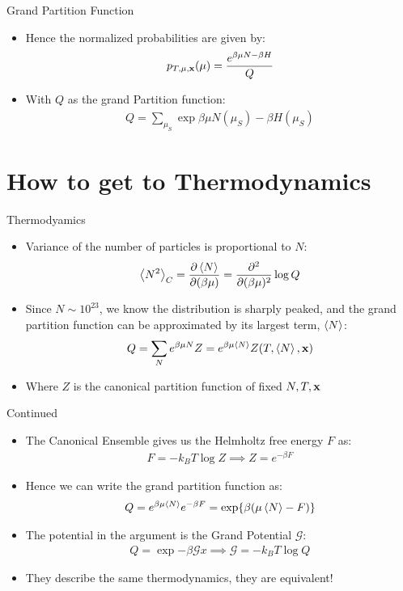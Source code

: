 \documentclass{beamer}
\begin{document}
\begin{frame}{Grand Partition Function}
  \begin{itemize}
  \item Hence the normalized probabilities are given by:
    \begin{align*}
      p_{T,\mu,\vb{x}}(\mu)=\frac{e^{\beta\mu N-\beta H}}{Q}
    \end{align*}
  \item With $Q$ as the grand Partition function:
    \begin{align*}
      Q=\sum_{\mu_S}\exp{\beta\mu N(\mu_S)-\beta H(\mu_S)}
    \end{align*}
  \end{itemize}
\end{frame}

\section{How to get to Thermodynamics}
\begin{frame}{Thermodyamics}
  \begin{itemize}
  \item Variance of the number of particles is proportional to $N$:
    \begin{align*}
      \ev{N^2}_C=\pdv{\ev{N}}{(\beta\mu)}=\pdv[2]{(\beta\mu)}\log Q
    \end{align*}
  \item Since $N\sim10^{23}$, we know the distribution is sharply peaked, and the grand partition function can be approximated by its largest term, $\ev{N}$:
    \begin{align*}
      Q=\sum_Ne^{\beta\mu N}Z=e^{\beta\mu \ev{N}}Z(T,\ev{N},\vb{x})
    \end{align*}
  \item Where $Z$ is the canonical partition function of fixed $N,T,\vb{x}$ 
  \end{itemize}
\end{frame}
\begin{frame}{Continued}
  \begin{itemize}
  \item The Canonical Ensemble gives us the Helmholtz free energy $F$ as:
    \begin{align*}
      F=-k_BT\log Z\implies Z=e^{-\beta F}
    \end{align*}
  \item Hence we can write the grand partition function as:
    \begin{align*}
      Q=e^{\beta\mu \ev{N}}e^{-\beta F}=\exp{\beta\qty(\mu \ev{N}-F)}
    \end{align*}
  \item The potential in the argument is the Grand Potential $\mathcal{G}$:
    \begin{align*}
      Q=\exp{-\beta\mathcal{G}}x\implies\mathcal{G}=-k_BT\log Q
    \end{align*}
  \item They describe the same thermodynamics, they are equivalent!
  \end{itemize}
\end{frame}
\end{document}
